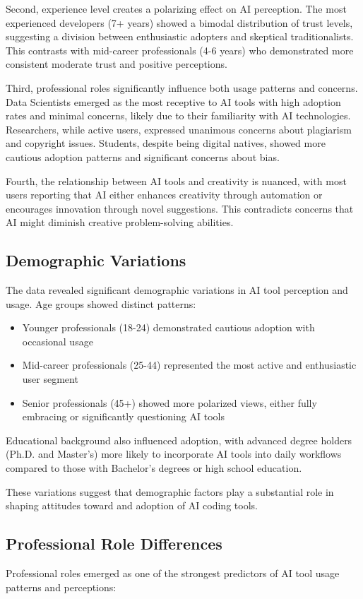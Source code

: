 \documentclass[conference]{IEEEtran}
\begin{document}
Second, experience level creates a polarizing effect on AI perception. The most experienced developers (7+ years) showed a bimodal distribution of trust levels, suggesting a division between enthusiastic adopters and skeptical traditionalists. This contrasts with mid-career professionals (4-6 years) who demonstrated more consistent moderate trust and positive perceptions.

Third, professional roles significantly influence both usage patterns and concerns. Data Scientists emerged as the most receptive to AI tools with high adoption rates and minimal concerns, likely due to their familiarity with AI technologies. Researchers, while active users, expressed unanimous concerns about plagiarism and copyright issues. Students, despite being digital natives, showed more cautious adoption patterns and significant concerns about bias.

Fourth, the relationship between AI tools and creativity is nuanced, with most users reporting that AI either enhances creativity through automation or encourages innovation through novel suggestions. This contradicts concerns that AI might diminish creative problem-solving abilities.

\subsection{Demographic Variations}
The data revealed significant demographic variations in AI tool perception and usage. Age groups showed distinct patterns:
\begin{itemize}
    \item Younger professionals (18-24) demonstrated cautious adoption with occasional usage
    \item Mid-career professionals (25-44) represented the most active and enthusiastic user segment
    \item Senior professionals (45+) showed more polarized views, either fully embracing or significantly questioning AI tools
\end{itemize}

Educational background also influenced adoption, with advanced degree holders (Ph.D. and Master's) more likely to incorporate AI tools into daily workflows compared to those with Bachelor's degrees or high school education.

These variations suggest that demographic factors play a substantial role in shaping attitudes toward and adoption of AI coding tools.

\subsection{Professional Role Differences}
Professional roles emerged as one of the strongest predictors of AI tool usage patterns and perceptions:
\end{document}
